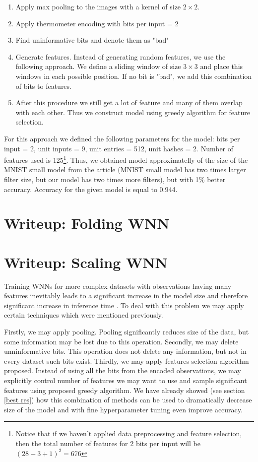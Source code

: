 \documentclass{article}[12pt]
\begin{document}
\begin{enumerate}
    \item Apply max pooling to the images with a kernel of size $2\times{}2$. 
    \item Apply thermometer encoding with bits per input = 2
    \item Find uninformative bits and denote them as "bad"
    \item Generate features. Instead of generating random features, we use the following approach. We define a sliding window of size $3 \times 3$ and place this windows in each possible position. If no bit is "bad", we add this combination of bits to features.
    \item After this procedure we still get a lot of feature and many of them overlap with each other. Thus we construct model using greedy algorithm for feature selection.
\end{enumerate}

For this approach we defined the following parameters for the model: bits per input = 2, unit inputs = 9, unit entries = 512, unit hashes = 2. Number of features used is 125\footnote{Notice that if we haven't applied data preprocessing and feature selection, then the total number of features for 2 bits per input will be $(28-3+1)^2 = 676$}. Thus, we obtained model approximatelly of the size of the MNIST small model from the article \cite{susskind2022weightless} (MNIST small model has two times larger filter size, but our model has two times more filters), but with 1\% better accuracy. Accuracy for the given model is equal to 0.944.


\newpage
\section{Writeup: Folding WNN}

\section{Writeup: Scaling WNN}
Training WNNs for more complex datasets with observations having many features inevitably leads to a significant increase in the model size and therefore significant increase in inference time \cite{aleksander2009brief}. To deal with this problem we may apply certain techniques which were mentioned previously.

Firstly, we may apply pooling. Pooling significantly reduces size of the data, but some information may be lost due to this operation. Secondly, we may delete unninformative bits. This operation does not delete any information, but not in every dataset such bits exist. Thirdly, we may apply features selection algorithm proposed. Instead of using all the bits from the encoded observations, we may explicitly control number of features we may want to use and sample significant features using proposed greedy algorithm. We have already showed (see section \ref{best res}) how this combination of methods can be used to dramatically decrease size of the model and with fine hyperparameter tuning even improve accuracy.
\end{document}
